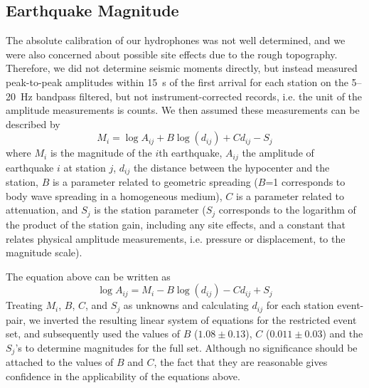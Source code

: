 \documentclass[jgr]{aguplus}
\newlength{\tw}
\begin{document}
\begin{article}
\section{Earthquake Magnitude}

The absolute calibration of our hydrophones was not well determined,
and we were also concerned about possible site effects due to
the rough topography.  Therefore, we did not determine seismic moments
directly, but instead measured peak-to-peak amplitudes within 15~s of
the first arrival for each station on the 5--20~Hz bandpass filtered,
but not instrument-corrected
records, i.e. the unit of the amplitude measurements is counts.
  We then assumed these measurements
can be described by \citep[modified from][]{hutton87}
\begin{equation}
M_i=\log A_{ij} + B \log(d_{ij}) + C d_{ij} - S_{j}
\end{equation}
where $M_i$ is the magnitude of the $i$th earthquake, $A_{ij}$ the
amplitude of earthquake $i$ at station $j$, $d_{ij}$ the distance
between the hypocenter and the station, $B$ is a parameter related to
geometric spreading ($B$=1 corresponds to body wave spreading in a
homogeneous medium), $C$ is a parameter related to attenuation, and
$S_{j}$ is the station parameter ($S_{j}$ corresponds to the logarithm
of the product of the station gain, including any site effects, and a
constant that relates physical amplitude measurements, i.e. pressure
or displacement, to the magnitude scale).

The equation above can be written as
\begin{equation}
\log A_{ij}= M_i - B \log(d_{ij}) - C d_{ij} + S_{j}
\end{equation}
Treating $M_i$, $B$, $C$, and $S_j$ as unknowns and calculating
$d_{ij}$ for each station event-pair, we inverted the resulting linear
system of equations for the restricted event set, and subsequently
used the values of $B$ ($1.08 \pm 0.13$), $C$ ($0.011\pm0.03$) and the
$S_{j}$'s to determine magnitudes for the full set.
Although no significance should be attached to the values of $B$ and
$C$, the fact that they are reasonable gives confidence in the
applicability of the equations above.


\end{article}
\end{document}
